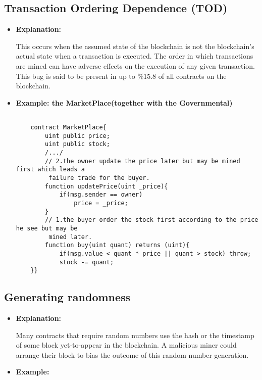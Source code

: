 \documentclass{llncs}
\begin{document}
\subsection{Transaction Ordering Dependence (TOD)}
\begin{itemize}
\item \textbf{Explanation:} 

This occurs when the assumed state of the blockchain is not the blockchain’s actual state when a transaction is executed. The order in which transactions are mined can have adverse effects on the execution of any given transaction. This bug is said to be present in up to $ \%15.8 $ of all contracts on the blockchain.

\item \textbf{Example: the MarketPlace(together with the Governmental)}

	\begin{minipage}{.5\textwidth} 
	{\scriptsize
	\begin{verbatim}
	
	contract MarketPlace{
	    uint public price;
	    uint public stock;
	    /.../
	    // 2.the owner update the price later but may be mined first which leads a
	     failure trade for the buyer.
	    function updatePrice(uint _price){
	        if(msg.sender == owner)
	            price = _price;
	    }
	    // 1.the buyer order the stock first according to the price he see but may be
	     mined later.  
	    function buy(uint quant) returns (uint){
	        if(msg.value < quant * price || quant > stock) throw;
	        stock -= quant;
	}}

	\end{verbatim} }
	\end{minipage}	

\end{itemize}

\subsection{Generating randomness}
\begin{itemize}
\item \textbf{Explanation:} 

Many contracts that require random numbers use the hash or the timestamp of some block yet-to-appear in the blockchain. A malicious miner could arrange their block to bias the outcome of this random number generation.

\item \textbf{Example:}

\end{itemize}
\end{document}
